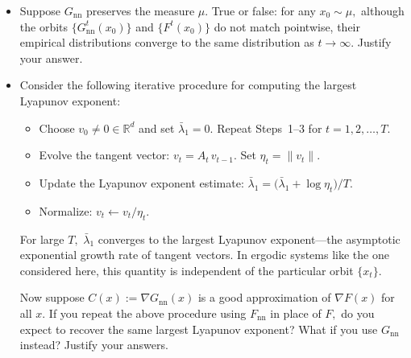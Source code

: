 \documentclass[12pt]{article}
\begin{document}
\begin{enumerate}
\begin{itemize}
        \newpage

        \item[(c)] Suppose $G_\mathrm{nn}$ preserves the measure $\mu.$ True or false: for any $x_0 \sim \mu,$ although the orbits $\{G_\mathrm{nn}^t(x_0)\}$ and $\{F^t(x_0)\}$ do not match pointwise, their empirical distributions converge to the same distribution as $t \to \infty.$ Justify your answer.

        \vspace{2.5in}

        \item[(d)] Consider the following iterative procedure for computing the largest Lyapunov exponent:
        \begin{itemize}
            \item[\textbf{Initialize.}] Choose $v_0 \neq 0 \in \mathbb{R}^d$ and set $\bar{\lambda}_1 = 0.$ Repeat Steps~1--3 for $t = 1, 2, \ldots, T.$
            \item[\textbf{Step 1.}] Evolve the tangent vector: $v_{t} = A_t\, v_{t-1}.$ Set $\eta_t = \|v_t\|.$
            \item[\textbf{Step 2.}] Update the Lyapunov exponent estimate: $\bar{\lambda}_1 = \bigl(\bar{\lambda}_1 + \log \eta_t\bigr)/T.$
            \item[\textbf{Step 3.}] Normalize: $v_t \leftarrow v_t / \eta_t.$
        \end{itemize}
        For large $T,$ $\bar{\lambda}_1$ converges to the largest Lyapunov exponent---the asymptotic exponential growth rate of tangent vectors. In ergodic systems like the one considered here, this quantity is independent of the particular orbit $\{x_t\}.$

        Now suppose $C(x) := \nabla G_\mathrm{nn}(x)$ is a good approximation of $\nabla F(x)$ for all $x.$ If you repeat the above procedure using $F_\mathrm{nn}$ in place of $F,$ do you expect to recover the same largest Lyapunov exponent? What if you use $G_\mathrm{nn}$ instead? Justify your answers.

        \vspace{2.5in}

    \end{itemize}

\end{enumerate}
\end{document}
